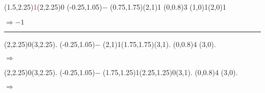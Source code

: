 \documentclass[11pt,a4paper]{article}
\begin{document}
\begin{center}
\begin{table}[ht!]
\begin{minipage}{0.15\textwidth}
\par\vspace{3\oplineheight}
\oplput(1.5,2.25){\scriptsize \textcolor{red}{1}}\oplput(2,2.25){0}
\oplput(-0.25,1.05){$-$}
\oplput(0.75,1.75){\tiny \textcolor{red}{}}\oplput(2,1){1}
\ophline(0,0.8){3}
\oplput(1,0){\textcolor{gray(x11gray)}{1}}\oplput(2,0){1}

\medskip

\textcolor{gray(x11gray)}{$ \mathit{\Rightarrow -1} $}

  \end{minipage}
\end{table}


\rule{1.0\linewidth}{0.75pt}

\begin{table}[ht!]
  \centering
  \begin{minipage}{0.15\textwidth}

\par\vspace{3\oplineheight}
\oplput(2,2.25){0}\oplput(3,2.25){.}
\oplput(-0.25,1.05){$-$}
\oplput(2,1){1}\oplput(1.75,1.75){\tiny \textcolor{blue}{}}\oplput(3,1){.}
\ophline(0,0.8){4}
\oplput(3,0){.}

  \end{minipage}
  \hfillx
  \begin{minipage}{0.1\textwidth}

\phantom{ } $ \Rightarrow $

  \end{minipage}
  \hfillx
  \begin{minipage}{0.15\textwidth}

\par\vspace{3\oplineheight}
\oplput(2,2.25){0}\oplput(3,2.25){.}
\oplput(-0.25,1.05){$-$}
\oplput(1.75,1.25){\scriptsize 1}\oplput(2.25,1.25){\scriptsize 0}\oplput(3,1){.}
\ophline(0,0.8){4}
\oplput(3,0){.}

  \end{minipage}
  \hfillx
  \begin{minipage}{0.1\textwidth}

\phantom{ } $ \Rightarrow $


\end{minipage}
\end{table}
\end{center}
\end{document}
